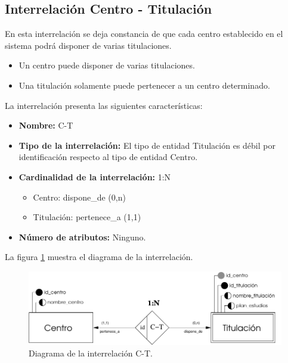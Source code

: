 \subsection{Interrelación Centro - Titulación}

   \begin{description}
      \item[Definición] En esta interrelación se deja constancia de que cada
      centro establecido en el sistema podrá disponer de varias titulaciones.

      \begin{itemize}
       \item Un centro puede disponer de varias titulaciones.
       \item Una titulación solamente puede pertenecer a un centro determinado.
      \end{itemize}

      \item[Características] La interrelación presenta las siguientes
                             características:

         \begin{itemize}
            \item \textbf{Nombre:} C-T
            \item \textbf{Tipo de la interrelación:} El tipo de entidad
                  Titulación es débil por identificación respecto al tipo de
                  entidad Centro.
            \item \textbf{Cardinalidad de la interrelación:} 1:N
                  \begin{itemize}
                     \item Centro: dispone\_de (0,n)
                     \item Titulación: pertenece\_a (1,1)
                  \end{itemize}
            \item \textbf{Número de atributos:} Ninguno.
         \end{itemize}

      \item[Diagrama] La figura \ref{diagramaC-T} muestra el diagrama de la
                      interrelación.
      \item \begin{figure}[!ht]
            \begin{center}
            \includegraphics[]{07.Modelo_Entidad-Interrelacion/7.3.Analisis_Interrelaciones/diagramas/C-T.pdf}
            \caption{Diagrama de la interrelación C-T.}
            \label{diagramaC-T}
            \end{center}
         \end{figure}


\end{description}
